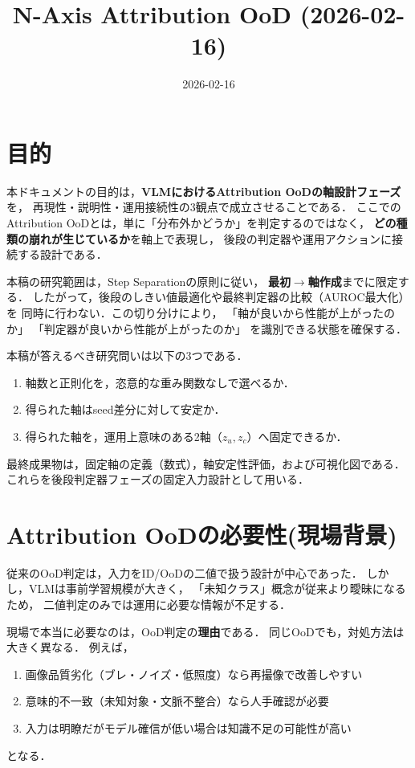 \documentclass[11pt,a4paper]{article}
\title{N-Axis Attribution OoD (2026-02-16)}
\author{}
\date{2026-02-16}
\begin{document}
\maketitle

\section{目的}
本ドキュメントの目的は，\textbf{VLMにおけるAttribution OoDの軸設計フェーズ}を，
再現性・説明性・運用接続性の3観点で成立させることである．
ここでのAttribution OoDとは，単に「分布外かどうか」を判定するのではなく，
\textbf{どの種類の崩れが生じているか}を軸上で表現し，
後段の判定器や運用アクションに接続する設計である．

本稿の研究範囲は，Step Separationの原則に従い，
\textbf{最初$\rightarrow$軸作成}までに限定する．
したがって，後段のしきい値最適化や最終判定器の比較（AUROC最大化）を
同時に行わない．この切り分けにより，
「軸が良いから性能が上がったのか」
「判定器が良いから性能が上がったのか」
を識別できる状態を確保する．

本稿が答えるべき研究問いは以下の3つである．
\begin{enumerate}
  \item 軸数と正則化を，恣意的な重み関数なしで選べるか．
  \item 得られた軸はseed差分に対して安定か．
  \item 得られた軸を，運用上意味のある2軸（$z_u,z_c$）へ固定できるか．
\end{enumerate}

最終成果物は，固定軸の定義（数式），軸安定性評価，および可視化図である．
これらを後段判定器フェーズの固定入力設計として用いる．

\section{Attribution OoDの必要性(現場背景)}
従来のOoD判定は，入力をID/OoDの二値で扱う設計が中心であった．
しかし，VLMは事前学習規模が大きく，
「未知クラス」概念が従来より曖昧になるため，
二値判定のみでは運用に必要な情報が不足する．

現場で本当に必要なのは，OoD判定の\textbf{理由}である．
同じOoDでも，対処方法は大きく異なる．
例えば，
\begin{enumerate}
  \item 画像品質劣化（ブレ・ノイズ・低照度）なら再撮像で改善しやすい
  \item 意味的不一致（未知対象・文脈不整合）なら人手確認が必要
  \item 入力は明瞭だがモデル確信が低い場合は知識不足の可能性が高い
\end{enumerate}
となる．
\end{document}
